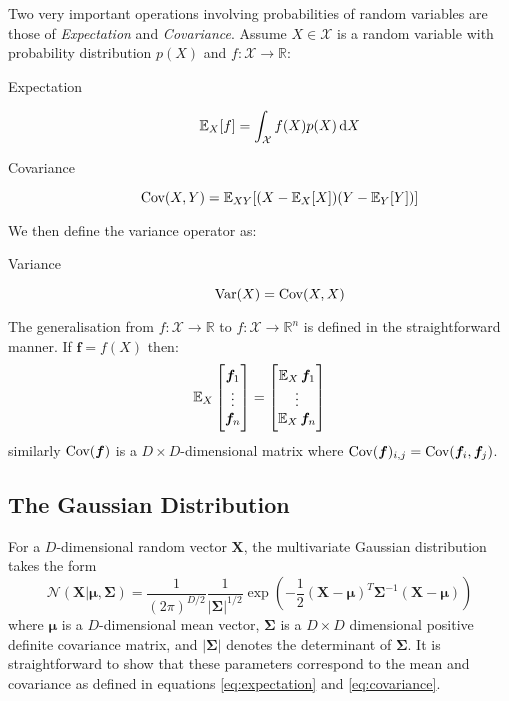 Two very important operations involving probabilities of random variables are
those of \textit{Expectation} and \textit{Covariance}. Assume $X \in \mathcal{X}$ is
a random variable with probability distribution $p(X)$ and $f : \mathcal{X} \to
\mathbb{R}$:
\begin{description}
\item[Expectation]
  \begin{equation}
    \label{eq:expectation}
    \E_X[f] = \int_{\mathcal{X}} f(X) p(X) \dif X
  \end{equation}
\item[Covariance]
  \begin{equation}
    \label{eq:covariance}
    \operatorname{\text{Cov}}(X, Y) = \operatorname{\mathbb{E}}_{XY}[(X - \operatorname{\mathbb{E}}_X[X])(Y - \operatorname{\mathbb{E}}_Y[Y])]
  \end{equation}
\end{description}
We then define the variance operator as:
\begin{description}
\item[Variance]
  \begin{equation}
    \label{eq:variance}
    \operatorname{\text{Var}}(X) = \operatorname{\text{Cov}}(X, X)
  \end{equation}
\end{description}
The generalisation from $f: \mathcal{X} \to \mathbb{R}$ to $f: \mathcal{X} \to
\mathbb{R}^n$ is defined in the straightforward manner. If $\bm{f} =
f(X)$ then:
\begin{equation*}
  \operatorname{\mathbb{E}}_X
  \begin{bmatrix}
    \bm{f}_1 \\
    \vdots \\
    \bm{f}_n \\
  \end{bmatrix} =
  \begin{bmatrix}
    \operatorname{\mathbb{E}}_X \bm{f}_1 \\
    \vdots \\
    \operatorname{\mathbb{E}}_X \bm{f}_n \\
  \end{bmatrix}
\end{equation*}
similarly $\operatorname{\text{Cov}}(\bm{f})$ is a $D \times D$-dimensional matrix where
$\operatorname{\text{Cov}}(\bm{f})_{i,j} = \operatorname{\text{Cov}}(\bm{f}_i, \bm{f}_j)$\cite{Bishop:2006}.

\subsection{The Gaussian Distribution}

For a $D$-dimensional random vector $\bm{X}$, the multivariate Gaussian
distribution takes the form
\begin{equation}
  \label{eq:Gaussian_dist}
  \mathcal{N}(\bm{X} | \bm{\mu}, \bm{\Sigma}) = \frac{1}{(2\pi)^{D/2}}\frac{1}{|\bm{\Sigma}|^{1/2}}\exp\left( -\frac{1}{2}(\bm{X} - \bm{\mu})^T\bm{\Sigma}^{-1}(\bm{X} - \bm{\mu})\right)
\end{equation}
where $\bm{\mu}$ is a $D$-dimensional mean vector, $\bm{\Sigma}$ is a $D \times
D$ dimensional positive definite covariance matrix, and $|\bm{\Sigma}|$ denotes
the determinant of $\bm{\Sigma}$. It is straightforward to show that these
parameters correspond to the mean and covariance as defined in equations
\eqref{eq:expectation} and \eqref{eq:covariance}\cite{}.


